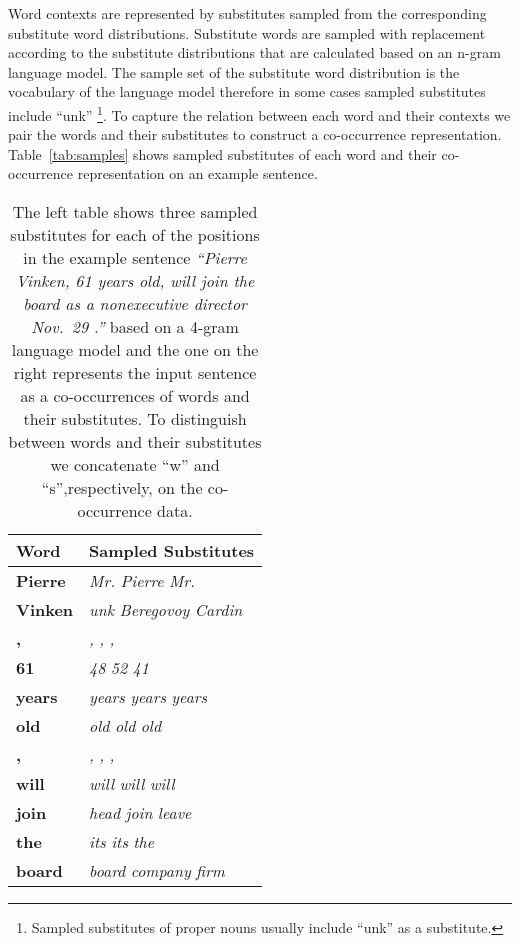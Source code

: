 Word contexts are represented by substitutes sampled from the
corresponding substitute word distributions.  Substitute words are
sampled with replacement according to the substitute distributions
that are calculated based on an n-gram language model.  The sample set
of the substitute word distribution is the vocabulary of the language
model therefore in some cases sampled substitutes include
``unk'' \footnote{Sampled substitutes of proper nouns usually include
  ``unk'' as a substitute.}.  To capture the relation between each
word and their contexts we pair the words and their substitutes to
construct a co-occurrence representation.  Table~\ref{tab:samples}
shows sampled substitutes of each word and their co-occurrence
representation on an example sentence.  
\begin{table}[h]
\caption{The left table shows three sampled substitutes for each of
  the positions in the example sentence \textit{``Pierre Vinken, 61
    years old, will join the board as a nonexecutive director Nov.~29
    .''} based on a 4-gram language model and the one on the right
  represents the input sentence as a co-occurrences of words and their
  substitutes.  To distinguish between words and their substitutes we
  concatenate ``w'' and ``s'',respectively, on the co-occurrence
  data.}
\begin{tabular}{|ll|} \hline
\textbf{Word} & \textbf{Sampled Substitutes}\\
\hline
\textbf{Pierre} & \textit{Mr.}  \textit{Pierre}  \textit{Mr.}\\
\textbf{Vinken} & \textit{unk}  \textit{Beregovoy}  \textit{Cardin}\\
\textbf{,} & \textit{,}  \textit{,}  \textit{,}\\
\textbf{61} & \textit{48}  \textit{52}  \textit{41}\\
\textbf{years} & \textit{years}  \textit{years}  \textit{years}\\
\textbf{old} & \textit{old}  \textit{old}  \textit{old}\\
\textbf{,} & \textit{,}  \textit{,}  \textit{,}\\
\textbf{will} & \textit{will}  \textit{will}  \textit{will}\\
\textbf{join} & \textit{head}  \textit{join}  \textit{leave}\\
\textbf{the}  & \textit{its}  \textit{its}  \textit{the}\\
\textbf{board} & \textit{board}  \textit{company}  \textit{firm}\\

\end{tabular}
\end{table}
